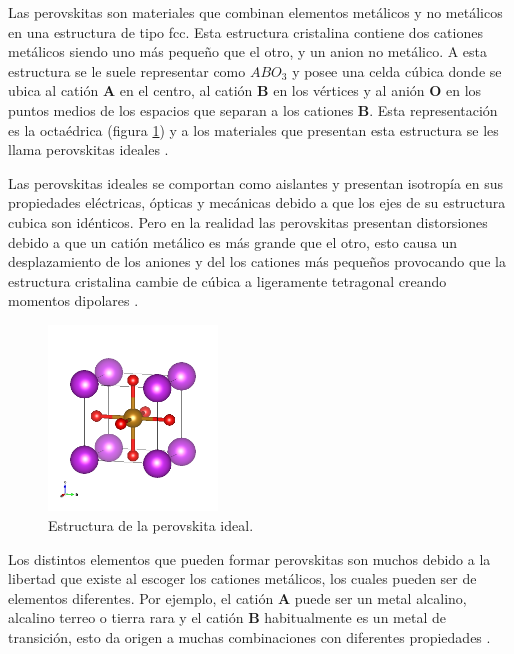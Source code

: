 Las perovskitas son materiales que combinan elementos met\'alicos y no met\'alicos en una estructura de tipo fcc. Esta estructura cristalina contiene dos cationes met\'alicos siendo uno m\'as peque\~no que el otro, y un anion no met\'alico. A esta estructura se le suele representar como $ABO_{3}$ y posee una celda c\'ubica donde se ubica al cati\'on {\bf A} en el centro, al cati\'on {\bf B} en los v\'ertices y al ani\'on {\bf O} en los puntos medios de los espacios que separan a los cationes {\bf B}. Esta representaci\'on es la octa\'edrica (figura \ref{perovskita_cubica}) y a los materiales que presentan esta estructura se les llama perovskitas ideales \cite{inigues2008}.

\noindent Las perovskitas ideales se comportan como aislantes y presentan isotrop\'ia en sus propiedades el\'ectricas, \'opticas y mec\'anicas debido a que los ejes de su estructura cubica son id\'enticos. Pero en la realidad las perovskitas presentan distorsiones debido a que un cati\'on met\'alico es m\'as grande que el otro, esto causa un desplazamiento de los aniones y del los cationes m\'as peque\~nos provocando que la estructura cristalina cambie de c\'ubica a ligeramente tetragonal creando momentos dipolares \cite{nicola2000}.

\begin{figure}[H]
    \centering
    \includegraphics[width=0.4\textwidth]{contenido/marco_teorico/perovskitas/img_Perovskitas/perovskita_cubica.png}
    \caption{Estructura de la perovskita ideal.}
    \label{perovskita_cubica}
\end{figure}

\noindent Los distintos elementos que pueden formar perovskitas son muchos debido a la libertad que existe al escoger los cationes met\'alicos, los cuales pueden ser de elementos diferentes. Por ejemplo, el cati\'on {\bf A} puede ser un metal alcalino, alcalino terreo o tierra rara y el cati\'on {\bf B} habitualmente es un metal de transici\'on, esto da origen a muchas combinaciones con diferentes propiedades \cite{inigues2008}.

